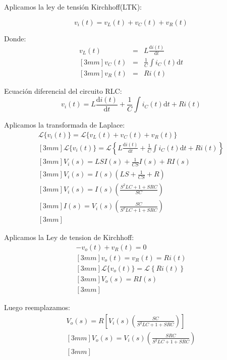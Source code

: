 \documentclass[12pt]{article}
\begin{document}
Aplicamos la ley de tensi\'on Kirchhoff(LTK):

$$v_{i}(t) = v_{L}(t) + v_{C}(t) + v_{R}(t)$$

Donde:
\begin{eqnarray*}
  v_{L}(t) &=& L\frac{\mathrm{d}i(t)}{\mathrm{d}t} \\ [3mm]
  v_{C}(t) &=& \frac{1}{C}\int i_{C}(t) \mathrm{d}t \\ [3mm]
  v_{R}(t) &=& Ri(t)
\end{eqnarray*}

Ecuación diferencial del circuito RLC:
\begin{equation*}
  v_{i}(t) = L\frac{\mathrm{d}i(t)}{\mathrm{d}t} + \frac{1}{C}\int i_{C}(t) \mathrm{d}t + Ri(t)
\end{equation*}

Aplicamos la transformada de Laplace:
\begin{eqnarray*}
  \mathscr{L}\{v_{i}(t)\} = \mathscr{L}\{v_{L}(t) + v_{C}(t) + v_{R}(t)\} \\  [3mm]
  \mathscr{L}\{v_{i}(t)\} = \mathscr{L}\left \{L\frac{\mathrm{d}i(t)}{\mathrm{d}t} + \frac{1}{C}\int i_{C}(t) \mathrm{d}t +Ri(t)\right \} \\ [3mm]
  V_{i}(s) = LSI(s) + \frac{1}{CS}I(s) + RI(s) \\ [3mm]
  V_{i}(s) = I(s)\left (LS + \frac{1}{CS} + R \right) \\ [3mm]
  V_{i}(s) = I(s)\left (\frac{S^{2}LC+1+SRC}{SC} \right) \\ [3mm]
  I(s) = V_{i}(s)\left (\frac{SC}{S^{2}LC+1+SRC} \right) \\ [3mm]
\end{eqnarray*}

Aplicamos la Ley de tension de Kirchhoff:
\begin{eqnarray*}
  -v_{o}(t) + v_{R}(t) = 0 \\ [3mm]
  v_{o}(t) = v_{R}(t) = Ri(t) \\ [3mm]
  \mathscr{L}\{v_{o}(t)\} = \mathscr{L}\left \{Ri(t)\right \} \\ [3mm]
  V_{o}(s) = RI(s) \\ [3mm]
\end{eqnarray*}

Luego reemplazamos:
\begin{eqnarray*}
  V_{o}(s) = R\left[ V_{i}(s)\left( \frac{SC}{S^{2}LC+1+SRC} \right) \right] \\ [3mm]
  V_{o}(s) = V_{i}(s)\left( \frac{SRC}{S^{2}LC+1+SRC} \right) \\ [3mm]
\end{eqnarray*}
\end{document}
